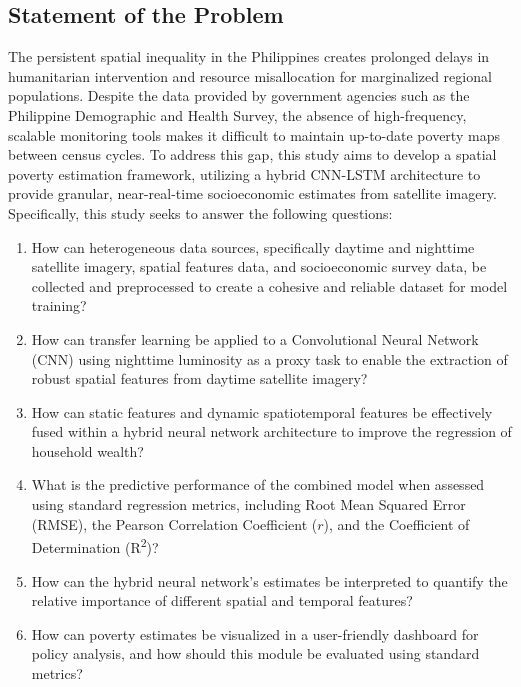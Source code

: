 \documentclass[12pt, letterpaper]{article}
\numberwithin{figure}{section}
\numberwithin{table}{section}
\begin{document}
\subsection{Statement of the Problem}
The persistent spatial inequality in the Philippines creates
prolonged delays in humanitarian intervention and resource
misallocation for marginalized regional populations. Despite the data
provided by government agencies such as the Philippine Demographic
and Health Survey, the absence of high-frequency, scalable monitoring
tools makes it difficult to maintain up-to-date poverty maps between
census cycles. To address this gap, this study aims to develop a
spatial poverty estimation framework, utilizing a hybrid CNN-LSTM
architecture to provide granular, near-real-time socioeconomic
estimates from satellite imagery. Specifically, this study seeks to
answer the following questions:
\begin{enumerate}
  \item How can heterogeneous data sources, specifically daytime and
    nighttime satellite imagery, spatial features data, and
    socioeconomic survey data, be collected and preprocessed to
    create a cohesive and reliable dataset for model training?
  \item How can transfer learning be applied to a Convolutional
    Neural Network (CNN) using nighttime luminosity as a proxy task
    to enable the extraction of robust spatial features from daytime
    satellite imagery?
  \item How can static features and dynamic
    spatiotemporal features be effectively fused within a hybrid
    neural network architecture to improve the regression of household wealth?
  \item What is the predictive performance of the combined model when
    assessed using standard regression metrics, including Root Mean
    Squared Error (RMSE), the Pearson
    Correlation Coefficient ($r$), and the Coefficient of
    Determination (R\textsuperscript{2})?
  \item How can the hybrid neural network's estimates be interpreted
    to quantify the relative importance of different spatial and
    temporal features?
  \item How can poverty estimates be visualized in a user-friendly
    dashboard for policy analysis, and how should this module be
    evaluated using standard metrics?
\end{enumerate}
\end{document}
